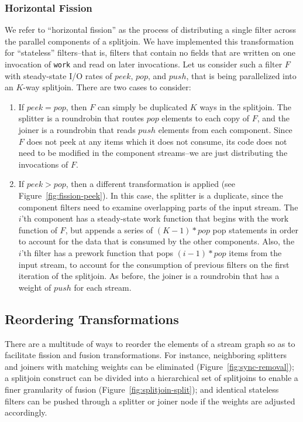 \subsubsection{Horizontal Fission}

We refer to ``horizontal fission'' as the process of distributing a
single filter across the parallel components of a splitjoin.  We have
implemented this transformation for ``stateless'' filters--that is,
filters that contain no fields that are written on one invocation of
{\tt work} and read on later invocations.  Let us consider such a
filter $F$ with steady-state I/O rates of $peek$, $pop$, and $push$,
that is being parallelized into an $K$-way splitjoin.  There are two
cases to consider:
\begin{enumerate}
\item If {\bf $peek = pop$}, then $F$ can simply be duplicated $K$
ways in the splitjoin.  The splitter is a roundrobin that routes $pop$
elements to each copy of $F$, and the joiner is a roundrobin that
reads $push$ elements from each component.  Since $F$ does not peek at
any items which it does not consume, its code does not need to be
modified in the component streams--we are just distributing the
invocations of $F$.

\item If {\bf $peek > pop$}, then a different transformation is
applied (see Figure~\ref{fig:fission-peek}).  In this case, the
splitter is a duplicate, since the component filters need to examine
overlapping parts of the input stream.  The $i$'th component has a
steady-state work function that begins with the work function of $F$,
but appends a series of $(K-1)*pop$ pop statements in order to account
for the data that is consumed by the other components.  Also, the
$i$'th filter has a prework function that pops $(i-1)*pop$ items from
the input stream, to account for the consumption of previous filters
on the first iteration of the splitjoin.  As before, the joiner is a
roundrobin that has a weight of $push$ for each stream.
\end{enumerate}

\subsection{Reordering Transformations}

There are a multitude of ways to reorder the elements of a stream
graph so as to facilitate fission and fusion transformations.  For
instance, neighboring splitters and joiners with matching weights can
be eliminated (Figure~\ref{fig:sync-removal}); a splitjoin construct
can be divided into a hierarchical set of splitjoins to enable a finer
granularity of fusion (Figure~\ref{fig:splitjoin-split}); and 
identical stateless filters can be pushed through a splitter or joiner
node if the weights are adjusted accordingly.

